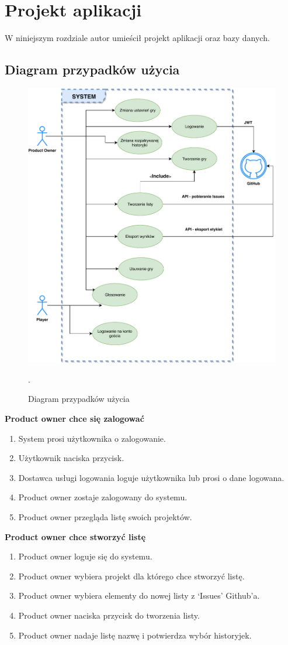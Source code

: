 \chapter{Projekt aplikacji}
W niniejszym rozdziale autor umieścił projekt aplikacji oraz bazy danych.
\section{Diagram przypadków użycia}
\begin{figure}[H]
	\centering\includegraphics[width=.9\textwidth]{img/useCase}
	\caption{Diagram przypadków użycia}.\label{rys:useCase}
\end{figure}
\textbf{Product owner chce się zalogować}
\begin{enumerate}
    \item System prosi użytkownika o zalogowanie.
    \item Użytkownik naciska przycisk.
    \item Dostawca usługi logowania loguje użytkownika lub prosi o dane logowana.
    \item Product owner zostaje zalogowany do systemu.
    \item Product owner przegląda listę swoich projektów.
\end{enumerate}
\textbf{Product owner chce stworzyć listę}
\begin{enumerate}
    \item Product owner loguje się do systemu.
    \item Product owner wybiera projekt dla którego chce stworzyć listę.
    \item Product owner wybiera elementy do nowej listy z `Issues' Github'a.
    \item Product owner naciska przycisk do tworzenia listy.
    \item Product owner nadaje listę nazwę i potwierdza wybór historyjek.
\end{enumerate}
